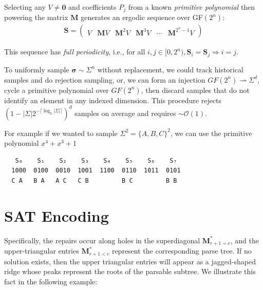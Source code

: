 \documentclass[sigplan,nonacm]{acmart}\settopmatter{printfolios=false,printccs=false,printacmref=false}
\begin{document}
Selecting any $V \neq \mathbf{0}$ and coefficients $P_j$ from a known \textit{primitive polynomial} then powering the matrix $\mathbf{M}$ generates an ergodic sequence over GF$(2^n)$:\\

\begin{align}
    \mathbf{S} = \begin{pmatrix}V & \mathbf{M}V & \mathbf{M}^{2}V & \mathbf{M}^{3}V & \cdots & \mathbf{M}^{2^n-1}V \end{pmatrix}
\end{align}

\noindent This sequence has \textit{full periodicity}, i.e., for all $i, j \in [0, 2^n), \mathbf{S}_i = \mathbf{S}_j \Rightarrow i = j$.


To uniformly sample $\bm\sigma \sim \Sigma^n$ without replacement, we could track historical samples and do rejection sampling, or, we can form an injection $GF(2^n)\rightharpoonup\Sigma^d$, cycle a primitive polynomial over $GF(2^n)$, then discard samples that do not identify an element in any indexed dimension. This procedure rejects $(1 - |\Sigma|2^{-\lceil\log_2|\Sigma|\rceil})^d$ samples on average and requires $\sim\mathcal{O}(1)$.

For example if we wanted to sample $\Sigma^2 = \{A, B, C\}^2$, we can use the primitive polynomial $x^4 + x^3 +1$

\begin{verbatim}
   S₀    S₁    S₂    S₃    S₄    S₅    S₆    S₇
  1000  0100  0010  1001  1100  0110  1011  0101
  C A   B A   A C   C B         B C         B B
\end{verbatim}

\pagebreak
\section{SAT Encoding}\label{sec:sat}

Specifically, the repairs occur along holes in the superdiagonal $\mathbf{M}^*_{r+1 = c}$, and the upper-triangular entries $\mathbf{M}^*_{r + 1 < c}$ represent the corresponding parse tree. If no solution exists, then the upper triangular entries will appear as a jagged-shaped ridge whose peaks represent the roots of the parsable subtree. We illustrate this fact in the following example:
\end{document}
